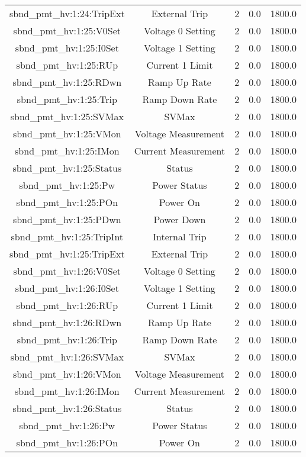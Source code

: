 \begin{center}
\begin{longtable}{c | c c c c }
sbnd\_pmt\_hv:1:24:TripExt & External Trip & 2 & 0.0 & 1800.0\\ 
sbnd\_pmt\_hv:1:25:V0Set & Voltage 0 Setting & 2 & 0.0 & 1800.0\\ 
sbnd\_pmt\_hv:1:25:I0Set & Voltage 1 Setting & 2 & 0.0 & 1800.0\\ 
sbnd\_pmt\_hv:1:25:RUp & Current 1 Limit & 2 & 0.0 & 1800.0\\ 
sbnd\_pmt\_hv:1:25:RDwn & Ramp Up Rate & 2 & 0.0 & 1800.0\\ 
sbnd\_pmt\_hv:1:25:Trip & Ramp Down Rate & 2 & 0.0 & 1800.0\\ 
sbnd\_pmt\_hv:1:25:SVMax & SVMax & 2 & 0.0 & 1800.0\\ 
sbnd\_pmt\_hv:1:25:VMon & Voltage Measurement & 2 & 0.0 & 1800.0\\ 
sbnd\_pmt\_hv:1:25:IMon & Current Measurement & 2 & 0.0 & 1800.0\\ 
sbnd\_pmt\_hv:1:25:Status & Status & 2 & 0.0 & 1800.0\\ 
sbnd\_pmt\_hv:1:25:Pw & Power Status & 2 & 0.0 & 1800.0\\ 
sbnd\_pmt\_hv:1:25:POn & Power On & 2 & 0.0 & 1800.0\\ 
sbnd\_pmt\_hv:1:25:PDwn & Power Down & 2 & 0.0 & 1800.0\\ 
sbnd\_pmt\_hv:1:25:TripInt & Internal Trip & 2 & 0.0 & 1800.0\\ 
sbnd\_pmt\_hv:1:25:TripExt & External Trip & 2 & 0.0 & 1800.0\\ 
sbnd\_pmt\_hv:1:26:V0Set & Voltage 0 Setting & 2 & 0.0 & 1800.0\\ 
sbnd\_pmt\_hv:1:26:I0Set & Voltage 1 Setting & 2 & 0.0 & 1800.0\\ 
sbnd\_pmt\_hv:1:26:RUp & Current 1 Limit & 2 & 0.0 & 1800.0\\ 
sbnd\_pmt\_hv:1:26:RDwn & Ramp Up Rate & 2 & 0.0 & 1800.0\\ 
sbnd\_pmt\_hv:1:26:Trip & Ramp Down Rate & 2 & 0.0 & 1800.0\\ 
sbnd\_pmt\_hv:1:26:SVMax & SVMax & 2 & 0.0 & 1800.0\\ 
sbnd\_pmt\_hv:1:26:VMon & Voltage Measurement & 2 & 0.0 & 1800.0\\ 
sbnd\_pmt\_hv:1:26:IMon & Current Measurement & 2 & 0.0 & 1800.0\\ 
sbnd\_pmt\_hv:1:26:Status & Status & 2 & 0.0 & 1800.0\\ 
sbnd\_pmt\_hv:1:26:Pw & Power Status & 2 & 0.0 & 1800.0\\ 
sbnd\_pmt\_hv:1:26:POn & Power On & 2 & 0.0 & 1800.0\\ 

\end{longtable}
\end{center}
